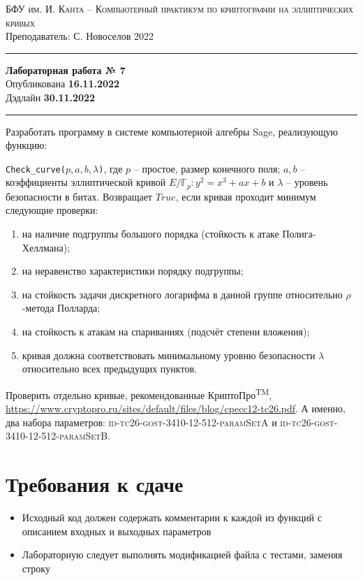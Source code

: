\documentclass[11pt]{exam}
\theoremstyle{definition}
\begin{document}
	
	{\noindent
		\textsc{БФУ им. И. Канта -- Компьютерный практикум по криптографии на эллиптических кривых }\\[5pt]
		Преподаватель: {С. Новоселов}   \hfill{2022\\}
	\hrule
	\begin{center}
		{\LARGE\textbf{
				Лабораторная работа № 7 \\[5pt]
		}} 
			Опубликована \textbf{16.11.2022} \\[5pt] 
			Дэдлайн \textbf{30.11.2022}
		
	\end{center}
	\hrule \vspace{5mm}
	
	\thispagestyle{empty}
	
	Разработать программу в системе компьютерной алгебры Sage, реализующую функцию:
    
        \texttt{Check\_curve($p, a, b, \lambda$)}, где $p$ -- простое, размер конечного поля; $a, b$ -- коэффициенты эллиптической кривой $E/\mathbb{F}_p: y^2 = x^3 + a x + b$ и  $\lambda$ -- уровень безопасности в битах. Возвращает $True$, если кривая проходит минимум следующие проверки:
        \begin{enumerate}
            \item на наличие подгруппы большого порядка (стойкость к атаке Полига-Хеллмана);
            \item на неравенство характеристики порядку подгруппы;
            \item на стойкость задачи дискретного логарифма в данной группе относительно $\rho$-метода Полларда;
            \item на стойкость к атакам на спариваниях (подсчёт степени вложения);
            \item кривая должна соответствовать минимальному уровню безопасности $\lambda$ относительно всех предыдущих пунктов.
        \end{enumerate}
    
    Проверить отдельно кривые, рекомендованные КриптоПро\textsuperscript{TM}, \url{https://www.cryptopro.ru/sites/default/files/blog/cpecc12-tc26.pdf}. А именно, два набора параметров: \textsc{ id-tc26-gost-3410-12-512-paramSetA} и \textsc{id-tc26-gost-3410-12-512-paramSetB}.
    
    
\normalsize
\section*{Требования к сдаче}
\begin{itemize}
    \item Исходный код должен содержать комментарии к каждой из функций с описанием входных и выходных параметров
    \item Лабораторную следует выполнять модификацией файла с тестами, заменяя строку
    

\end{itemize}}
\end{document}
